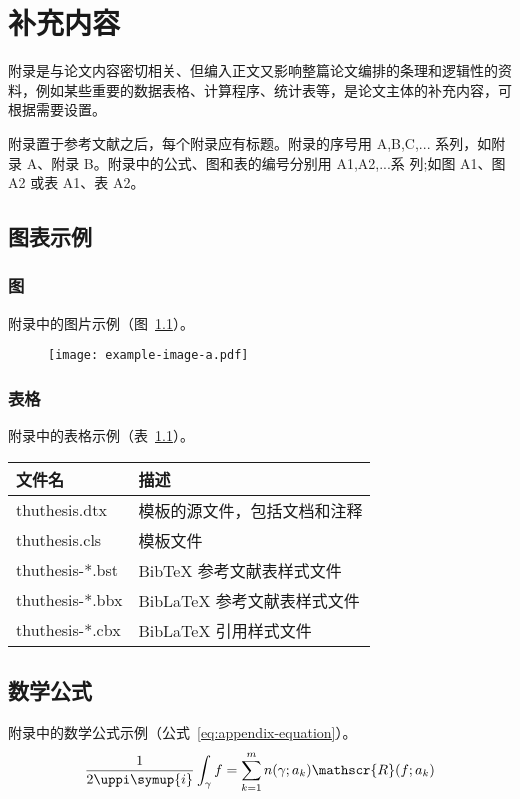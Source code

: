
\chapter{补充内容}

附录是与论文内容密切相关、但编入正文又影响整篇论文编排的条理和逻辑性的资料，例如某些重要的数据表格、计算程序、统计表等，是论文主体的补充内容，可根据需要设置。

附录置于参考文献之后，每个附录应有标题。附录的序号用 A,B,C,...
系列，如附录 A、附录 B。附录中的公式、图和表的编号分别用 A1,A2,...系
列;如图 A1、图 A2 或表 A1、表 A2。

\section{图表示例}

\subsection{图}

附录中的图片示例（图~\ref{fig:appendix-figure}）。

\begin{figure}
  \centering
  \texttt{[image: example-image-a.pdf]}
  \label{fig:appendix-figure}
\end{figure}


\subsection{表格}

附录中的表格示例（表~\ref{tab:appendix-table}）。

\begin{table}
  \centering
  \begin{tabular}{ll}
    \toprule
    文件名          & 描述                         \\
    \midrule
    thuthesis.dtx   & 模板的源文件，包括文档和注释 \\
    thuthesis.cls   & 模板文件                     \\
    thuthesis-*.bst & BibTeX 参考文献表样式文件    \\
    thuthesis-*.bbx & BibLaTeX 参考文献表样式文件  \\
    thuthesis-*.cbx & BibLaTeX 引用样式文件        \\
    \bottomrule
  \end{tabular}
  \label{tab:appendix-table}
\end{table}

\section{数学公式}

附录中的数学公式示例（公式~\eqref{eq:appendix-equation}）。
\begin{equation}
  \frac{1}{2 \uppi \symup{i}} \int_\gamma f = \sum_{k=1}^m n(\gamma; a_k) \mathscr{R}(f; a_k)
  \label{eq:appendix-equation}
\end{equation}

